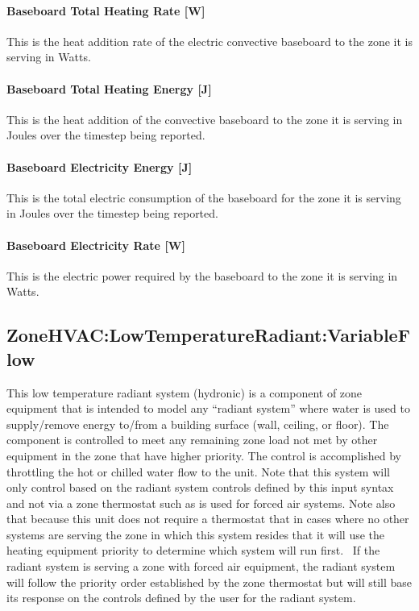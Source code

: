 \paragraph{Baseboard Total Heating Rate {[}W{]}}\label{baseboard-total-heating-rate-w-4}

This is the heat addition rate of the electric convective baseboard to the zone it is serving in Watts.

\paragraph{Baseboard Total Heating Energy {[}J{]}}\label{baseboard-total-heating-energy-j-4}

This is the heat addition of the convective baseboard to the zone it is serving in Joules over the timestep being reported.

\paragraph{Baseboard Electricity Energy {[}J{]}}\label{baseboard-electric-energy-j-1}

This is the total electric consumption of the baseboard for the zone it is serving in Joules over the timestep being reported.

\paragraph{Baseboard Electricity Rate {[}W{]}}\label{baseboard-electric-power-w-000}

This is the electric power required by the baseboard to the zone it is serving in Watts.

\subsection{ZoneHVAC:LowTemperatureRadiant:VariableFlow}\label{zonehvaclowtemperatureradiantvariableflow}

This low temperature radiant system (hydronic) is a component of zone equipment that is intended to model any ``radiant system'' where water is used to supply/remove energy to/from a building surface (wall, ceiling, or floor). The component is controlled to meet any remaining zone load not met by other equipment in the zone that have higher priority. The control is accomplished by throttling the hot or chilled water flow to the unit. Note that this system will only control based on the radiant system controls defined by this input syntax and not via a zone thermostat such as is used for forced air systems. Note also that because this unit does not require a thermostat that in cases where no other systems are serving the zone in which this system resides that it will use the heating equipment priority to determine which system will run first.~ If the radiant system is serving a zone with forced air equipment, the radiant system will follow the priority order established by the zone thermostat but will still base its response on the controls defined by the user for the radiant system.

